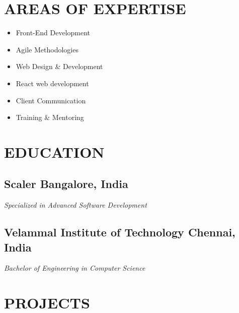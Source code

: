 \documentclass[a4paper,10pt]{article}
\newcommand{\dateright}[1]{\hfill \small \textbf{#1}}
\begin{document}
\section*{AREAS OF EXPERTISE}
\vspace{-1.2em}
\begin{multicols}{3}
\begin{itemize}
    \item Front-End Development
    \item Agile Methodologies
\end{itemize}

\columnbreak %

\begin{itemize}
    \item Web Design \& Development
    \item React web development
\end{itemize}

\columnbreak %

\begin{itemize}
    \item Client Communication
    \item Training \& Mentoring
\end{itemize}
\end{multicols}

\section*{EDUCATION}
\subsection*{Scaler \dateright{Bangalore, India}}
\vspace{-0.4em}
\noindent \textit{Specialized in Advanced Software Development} 

\vspace{-0.2em}

\subsection*{Velammal Institute of Technology \dateright{Chennai, India}}
\vspace{-0.4em}
\noindent \textit{Bachelor of Engineering in Computer Science}

\section*{PROJECTS}
\end{document}
